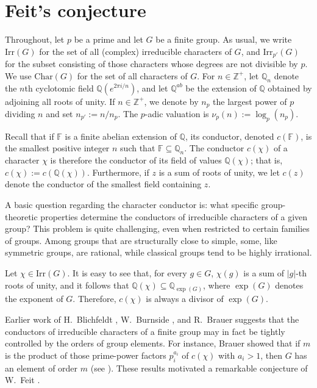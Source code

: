 \documentclass[12pt]{amsart}
\theoremstyle{definition}
\numberwithin{equation}{section}
\newcommand{\Irr}{{\mathrm {Irr}}}
\newcommand{\Char}{{\mathrm {Char}}}
\newcommand{\QQ}{{\mathbb Q}}
\newcommand{\ZZ}{{\mathbb Z}}
\begin{document}
\section{Feit's conjecture}\label{sec:conductor}

Throughout, let $p$ be a prime and let $G$ be a finite group. As
usual, we write $\Irr(G)$ for the set of all (complex) irreducible
characters of $G$, and $\Irr_{p'}(G)$ for the subset consisting of
those characters whose degrees are not divisible by $p$. We use
$\Char(G)$ for the set of all characters of $G$. For $n\in\ZZ^+$,
let $\QQ_n$ denote the $n$th cyclotomic field $\QQ(e^{2\pi i/n})$,
and let $\QQ^{ab}$ be the extension of $\QQ$ obtained by adjoining
all roots of unity. If $n\in\ZZ^+$, we denote by $n_p$ the largest
power of $p$ dividing $n$ and set $n_{p'}:=n/n_p$. The $p$-adic
valuation is $\nu_p(n):=\log_p(n_p)$.

Recall that if $\mathbb{F}$ is a finite abelian extension of
$\mathbb{Q}$, its conductor, denoted $c(\mathbb{F})$, is the
smallest positive integer $n$ such that $\mathbb{F} \subseteq
\mathbb{Q}_n$. The conductor $c(\chi)$ of a character $\chi$ is
therefore the conductor of its field of values $\mathbb{Q}(\chi)$;
that is, $c(\chi) := c(\mathbb{Q}(\chi))$. Furthermore, if $z$ is a
sum of roots of unity, we let $c(z)$ denote the conductor of the
smallest field containing $z$.

A basic question regarding the character conductor is: what specific
group-theoretic properties determine the conductors of irreducible
characters of a given group? This problem is quite challenging, even
when restricted to certain families of groups. Among groups that are
structurally close to simple, some, like symmetric groups, are
rational, while classical groups tend to be highly irrational.



Let $\chi\in\Irr(G)$. It is easy to see that, for every $g\in G$,
$\chi(g)$ is a sum of $|g|$-th roots of unity, and it follows that
$\QQ(\chi)\subseteq \QQ_{\exp(G)}$, where $\exp(G)$ denotes the
exponent of $G$. Therefore, $c(\chi)$ is always a divisor of
$\exp(G)$.

Earlier work of H.~Blichfeldt \cite{Bl04}, W.~Burnside \cite{Bu11},
and R.~Brauer \cite{Brauer64} suggests that the conductors of
irreducible characters of a finite group may in fact be tightly
controlled by the orders of group elements. For instance, Brauer
showed that if $m$ is the product of those prime-power factors
$p_i^{a_i}$ of $c(\chi)$ with $a_i>1$, then $G$ has an element of
order $m$ (see \cite[Theorem~3.10]{Navarro18}). These results
motivated a remarkable conjecture of W.~Feit \cite{Feit80}.
\end{document}
